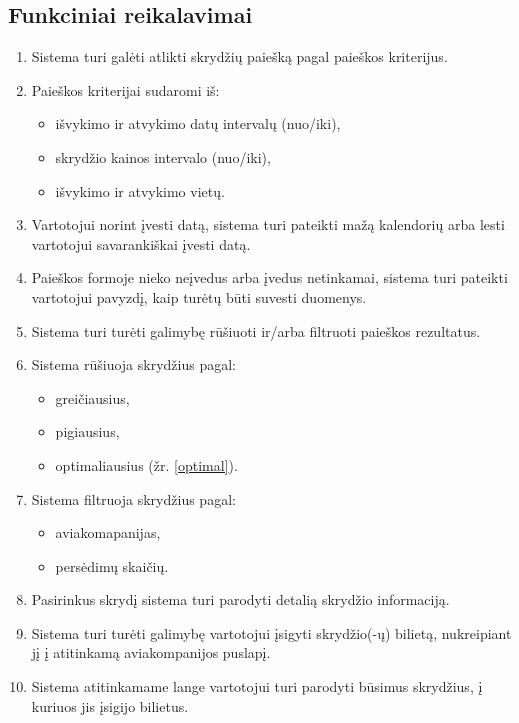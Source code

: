 \documentclass{VUMIFPSkursinis}
\begin{document}
            \subsection{Funkciniai reikalavimai}
                \begin{enumerate}[label=\textbf{FR\arabic*}.]
                    \item Sistema turi galėti atlikti skrydžių paiešką pagal paieškos kriterijus.
                    \item Paieškos kriterijai sudaromi iš:
                    \begin{itemize}
                    	\item išvykimo ir atvykimo datų intervalų (nuo/iki),
                    	\item skrydžio kainos intervalo (nuo/iki),
                    	\item išvykimo ir atvykimo vietų.
                    \end{itemize}
                    \item Vartotojui norint įvesti datą, sistema turi pateikti mažą kalendorių arba lesti vartotojui savarankiškai įvesti datą.
                    \item Paieškos formoje nieko neįvedus arba įvedus netinkamai, sistema turi pateikti vartotojui pavyzdį, kaip turėtų būti suvesti duomenys.
                    \item Sistema turi turėti galimybę rūšiuoti ir/arba  filtruoti paieškos rezultatus.
                    \item Sistema rūšiuoja skrydžius pagal:
                    \begin{itemize}
                    	\item greičiausius,
                    	\item pigiausius,
                    	\item optimaliausius (žr. \ref{optimal}).
                    \end{itemize}
                    \item Sistema filtruoja skrydžius pagal:
                    \begin{itemize}
                    	\item aviakomapanijas,
                    	\item persėdimų skaičių.
                    \end{itemize}
                    \item Pasirinkus skrydį sistema turi parodyti detalią skrydžio informaciją.
                    \item Sistema turi turėti galimybę vartotojui įsigyti skrydžio(-ų) bilietą, nukreipiant jį į atitinkamą aviakompanijos puslapį.
                    \item Sistema atitinkamame lange vartotojui turi parodyti būsimus skrydžius, į kuriuos jis įsigijo bilietus.
                \end{enumerate}
\end{document}
